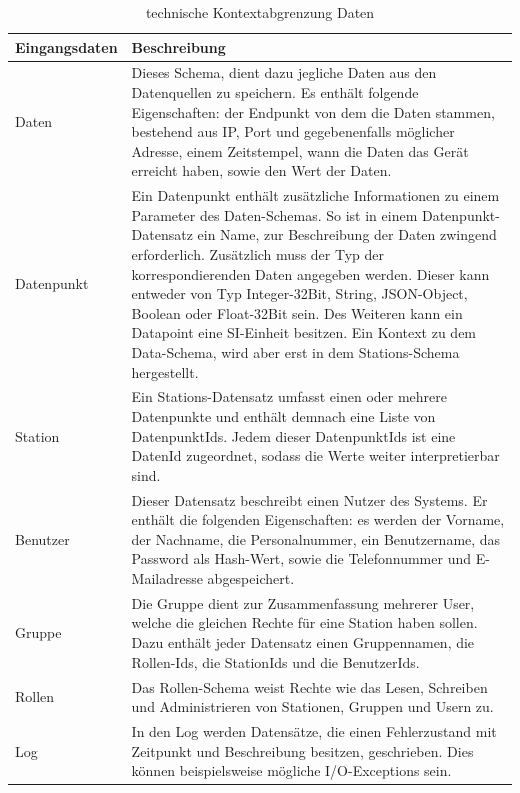 \begin{table}[t]
	\begin{tabularx}{\textwidth}{|l|X|}
		\hline
		Eingangsdaten & Beschreibung\\
		\hline
		Daten & Dieses Schema, dient dazu jegliche Daten aus den Datenquellen zu speichern. Es enthält folgende Eigenschaften: der Endpunkt von dem die Daten stammen, bestehend aus IP, Port und gegebenenfalls möglicher Adresse, einem Zeitstempel, wann die Daten das Gerät erreicht haben, sowie den Wert der Daten.\\
		\hline
		Datenpunkt & Ein Datenpunkt enthält zusätzliche Informationen zu einem Parameter des Daten-Schemas. So ist in einem Datenpunkt-Datensatz ein Name, zur Beschreibung der Daten zwingend erforderlich. Zusätzlich muss der Typ der korrespondierenden Daten angegeben werden. Dieser kann entweder von Typ Integer-32Bit, String, JSON-Object, Boolean oder Float-32Bit sein. Des Weiteren kann ein Datapoint eine SI-Einheit besitzen. Ein Kontext zu dem Data-Schema, wird aber erst in dem Stations-Schema hergestellt.\\
		\hline
		Station & Ein Stations-Datensatz umfasst einen oder mehrere Datenpunkte und enthält demnach eine Liste von DatenpunktIds. Jedem dieser DatenpunktIds ist eine DatenId zugeordnet, sodass die Werte weiter interpretierbar sind.\\
		\hline
		Benutzer & Dieser Datensatz beschreibt einen Nutzer des Systems. Er enthält die folgenden Eigenschaften: es werden der Vorname, der Nachname, die Personalnummer, ein Benutzername, das Password als Hash-Wert, sowie die Telefonnummer und E-Mailadresse abgespeichert.\\
		\hline
		Gruppe & Die Gruppe dient zur Zusammenfassung mehrerer User, welche die gleichen Rechte für eine Station haben sollen. Dazu enthält jeder Datensatz einen Gruppennamen, die Rollen-Ids, die  StationIds und die BenutzerIds.\\
		\hline
		Rollen & Das Rollen-Schema weist Rechte wie das Lesen, Schreiben und Administrieren von Stationen, Gruppen und Usern zu.\\
		\hline
		Log & In den Log werden Datensätze, die einen Fehlerzustand mit Zeitpunkt und Beschreibung besitzen, geschrieben. Dies können beispielsweise mögliche I/O-Exceptions sein.\\
		\hline
	\end{tabularx} 
	\caption{technische Kontextabgrenzung Daten}
	\label{tab:technischeKontextabgrenzungDaten}
\end{table}
